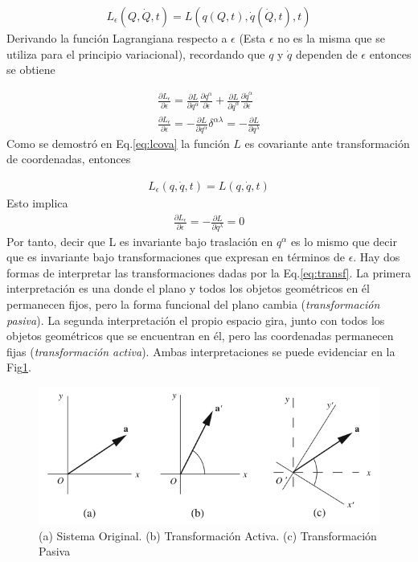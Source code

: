 \begin{gather}
    \label{eq:transf}L_\epsilon(Q,\dot{Q},t) = L(q(Q,t),\dot{q}(\dot{Q},t),t)
\end{gather}
Derivando la función Lagrangiana respecto a $\epsilon$ (Esta $\epsilon$ no es la misma que se utiliza para el principio variacional), recordando que $q$ y $\dot{q}$ dependen de $\epsilon$ entonces se obtiene

\begin{gather*}
    \frac{\partial L_\epsilon}{\partial \epsilon} = \frac{\partial L}{\partial q^{\alpha}}\frac{\partial q^{\alpha}}{\partial \epsilon} + \frac{\partial L}{\partial \dot{q}^{\alpha}}\frac{\partial \dot{q}^{\alpha}}{\partial \epsilon}\\
    \frac{\partial L_\epsilon}{\partial \epsilon} = - \frac{\partial L}{\partial q^{\alpha}}\delta^{\alpha\lambda} = -\frac{\partial L}{\partial q^{\lambda}}
\end{gather*}
Como se demostró en Eq.\ref*{eq:lcova} la función $L$ es covariante ante transformación de coordenadas, entonces 

\begin{gather*}
    L_\epsilon(q,\dot{q},t) = L(q,\dot{q},t)
\end{gather*}
Esto implica
\begin{gather*}
    \frac{\partial L_\epsilon}{\partial \epsilon} = -\frac{\partial L}{\partial q^{\lambda}} = 0
\end{gather*}
Por tanto, decir que L es invariante bajo traslación en $q^{\alpha}$ es lo mismo que decir que es invariante bajo transformaciones que expresan en términos de $\epsilon$. Hay dos formas de interpretar las transformaciones dadas por la Eq.\ref*{eq:transf}. La primera interpretación es una donde el plano y todos los objetos geométricos en él permanecen fijos, pero la forma funcional del plano cambia (\textit{transformación pasiva}). La segunda interpretación el propio espacio gira, junto con todos los objetos geométricos que se encuentran en él, pero las coordenadas permanecen fijas (\textit{transformación activa}). Ambas interpretaciones se puede evidenciar en la Fig\ref*{fig:transfor}.

\begin{figure}[h]
    \centering
    \includegraphics[scale = 1]{imgs/tps.png}
    \caption{(a) Sistema Original. (b) Transformación Activa. (c) Transformación Pasiva}
    \label{fig:transfor}
\end{figure}

